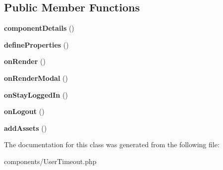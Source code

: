 \subsection*{Public Member Functions}
\begin{DoxyCompactItemize}
\item 
\hypertarget{classDMA_1_1Friends_1_1Components_1_1UserTimeout_aac849ff575a50043a1eb1c7fbccbc39d}{}{\bfseries component\+Details} ()\label{classDMA_1_1Friends_1_1Components_1_1UserTimeout_aac849ff575a50043a1eb1c7fbccbc39d}

\item 
\hypertarget{classDMA_1_1Friends_1_1Components_1_1UserTimeout_ab9a27c670f3bc34a2390723241f534b9}{}{\bfseries define\+Properties} ()\label{classDMA_1_1Friends_1_1Components_1_1UserTimeout_ab9a27c670f3bc34a2390723241f534b9}

\item 
\hypertarget{classDMA_1_1Friends_1_1Components_1_1UserTimeout_a0ef7c55f77dae39349bead8a5dc3dec8}{}{\bfseries on\+Render} ()\label{classDMA_1_1Friends_1_1Components_1_1UserTimeout_a0ef7c55f77dae39349bead8a5dc3dec8}

\item 
\hypertarget{classDMA_1_1Friends_1_1Components_1_1UserTimeout_a72aadb5d8be4a28cb77064843c0e3fe5}{}{\bfseries on\+Render\+Modal} ()\label{classDMA_1_1Friends_1_1Components_1_1UserTimeout_a72aadb5d8be4a28cb77064843c0e3fe5}

\item 
\hypertarget{classDMA_1_1Friends_1_1Components_1_1UserTimeout_a505b6eeb392b50007e1ddb74d0390184}{}{\bfseries on\+Stay\+Logged\+In} ()\label{classDMA_1_1Friends_1_1Components_1_1UserTimeout_a505b6eeb392b50007e1ddb74d0390184}

\item 
\hypertarget{classDMA_1_1Friends_1_1Components_1_1UserTimeout_a95c6498fa80a4c35cca3dc7e276d79e6}{}{\bfseries on\+Logout} ()\label{classDMA_1_1Friends_1_1Components_1_1UserTimeout_a95c6498fa80a4c35cca3dc7e276d79e6}

\item 
\hypertarget{classDMA_1_1Friends_1_1Components_1_1UserTimeout_a1b3f9633922c389243b154e2cfa90899}{}{\bfseries add\+Assets} ()\label{classDMA_1_1Friends_1_1Components_1_1UserTimeout_a1b3f9633922c389243b154e2cfa90899}

\end{DoxyCompactItemize}


The documentation for this class was generated from the following file\+:\begin{DoxyCompactItemize}
\item 
components/User\+Timeout.\+php\end{DoxyCompactItemize}
